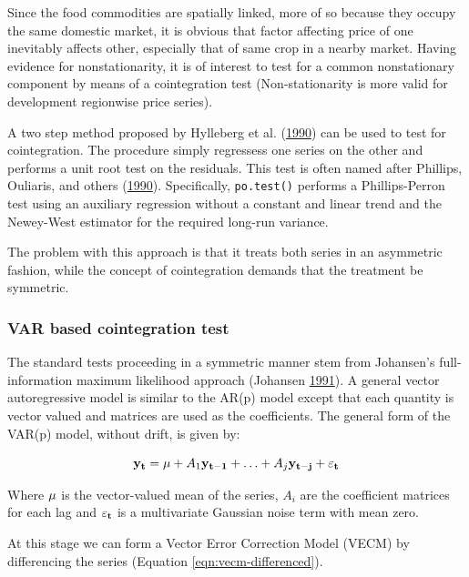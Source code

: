 \documentclass[12pt,]{article}
\begin{document}
Since the food commodities are spatially linked, more of so because they occupy the same domestic market, it is obvious that factor affecting price of one inevitably affects other, especially that of same crop in a nearby market. Having evidence for nonstationarity, it is of interest to test for a common nonstationary component by means of a cointegration test (Non-stationarity is more valid for development regionwise price series).

A two step method proposed by Hylleberg et al. (\protect\hyperlink{ref-hylleberg1990seasonal}{1990}) can be used to test for cointegration. The procedure simply regressess one series on the other and performs a unit root test on the residuals. This test is often named after Phillips, Ouliaris, and others (\protect\hyperlink{ref-phillips1990asymptotic}{1990}). Specifically, \texttt{po.test()} performs a Phillips-Perron test using an auxiliary regression without a constant and linear trend and the Newey-West estimator for the required long-run variance.

The problem with this approach is that it treats both series in an asymmetric fashion, while the concept of cointegration demands that the treatment be symmetric.

\hypertarget{var-based-cointegration-test}{%
\subsubsection{VAR based cointegration test}\label{var-based-cointegration-test}}

The standard tests proceeding in a symmetric manner stem from Johansen's full-information maximum likelihood approach (Johansen \protect\hyperlink{ref-johansen1991estimation}{1991}). A general vector autoregressive model is similar to the AR(p) model except that each quantity is vector valued and matrices are used as the coefficients. The general form of the VAR(p) model, without drift, is given by:

\begin{equation}
\label{eqn:var-general}
{\bf y_t} = {\bf \mu} + A_1 {\bf y_{t-1}} + \ldots + A_j {\bf y_{t-j}} + {\bf \varepsilon_t}
\end{equation}

Where \({\bf \mu}\) is the vector-valued mean of the series, \(A_i\) are the coefficient matrices for each lag and \({\bf \varepsilon_t}\) is a multivariate Gaussian noise term with mean zero.

At this stage we can form a Vector Error Correction Model (VECM) by differencing the series (Equation \ref{eqn:vecm-differenced}).
\end{document}
